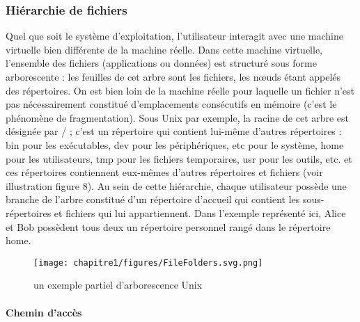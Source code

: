 \subsubsection{Hiérarchie de fichiers}
Quel que soit le système d’exploitation, l’utilisateur interagit avec une machine virtuelle bien différente de la
machine réelle. Dans cette machine virtuelle, l’ensemble des fichiers (applications ou données) est structuré
sous forme arborescente : les feuilles de cet arbre sont les fichiers, les nœuds étant appelés des répertoires. On
est bien loin de la machine réelle pour laquelle un fichier n’est pas nécessairement constitué d’emplacements
consécutifs en mémoire (c’est le phénomène de fragmentation).
Sous Unix par exemple, la racine de cet arbre est désignée par / ; c’est un répertoire qui contient lui-même
d’autres répertoires : bin pour les exécutables, dev pour les périphériques, etc pour le système, home pour les
utilisateurs, tmp pour les fichiers temporaires, usr pour les outils, etc. et ces répertoires contiennent eux-mêmes
d’autres répertoires et fichiers (voir illustration figure 8).
Au sein de cette hiérarchie, chaque utilisateur possède une branche de l’arbre constitué d’un répertoire d’accueil
qui contient les sous-répertoires et fichiers qui lui appartiennent. Dans l’exemple représenté ici, Alice et Bob
possèdent tous deux un répertoire personnel rangé dans le répertoire home.
\begin{figure}
    \centering
    \texttt{[image: chapitre1/figures/FileFolders.svg.png]}
    \caption{un exemple partiel d’arborescence Unix}
    \label{fig:my_label}
\end{figure}
\paragraph{Chemin d'accès}

